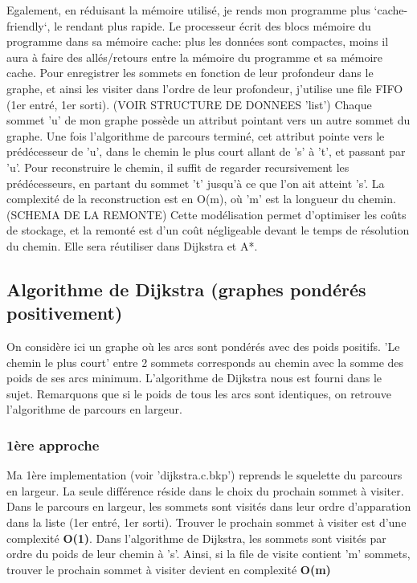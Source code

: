 \documentclass[10pt]{article}
\begin{document}
			Egalement, en réduisant la mémoire utilisé, je rends mon programme plus `cache-friendly`, le rendant plus rapide.
			Le processeur écrit des blocs mémoire du programme dans sa mémoire cache: plus les données sont compactes,
			moins il aura à faire des allés/retours entre la mémoire du programme et sa mémoire cache.\newline\newline
			Pour enregistrer les sommets en fonction de leur profondeur dans le graphe, et ainsi les visiter dans l'ordre de leur profondeur,
			j'utilise une file FIFO (1er entré, 1er sorti).\newline
			(VOIR STRUCTURE DE DONNEES 'list')\newline\newline
			Chaque sommet 'u' de mon graphe possède un attribut pointant vers un autre sommet du graphe.
			Une fois l'algorithme de parcours terminé, cet attribut pointe vers le prédécesseur de 'u',
			dans le chemin le plus court allant de 's' à 't', et passant par 'u'.
			Pour reconstruire le chemin, il suffit de regarder recursivement les prédécesseurs, en partant du sommet
			't' jusqu'à ce que l'on ait atteint 's'.
			La complexité de la reconstruction est en O(m), où 'm' est la longueur du chemin.\newline\newline
			(SCHEMA DE LA REMONTE)\newline\newline
			Cette modélisation permet d'optimiser les coûts de stockage, et la remonté est d'un coût négligeable devant le temps
			de résolution du chemin. Elle sera réutiliser dans Dijkstra et A*.
			
		\subsection{Algorithme de Dijkstra (graphes pondérés positivement)}
			On considère ici un graphe où les arcs sont pondérés avec des poids positifs.\newline
			'Le chemin le plus court' entre 2 sommets corresponds au chemin avec la somme des poids de ses arcs minimum.\newline
			L'algorithme de Dijkstra nous est fourni dans le sujet. Remarquons que si le poids de tous les arcs sont identiques,
			on retrouve l'algorithme de parcours en largeur.
			\subsubsection{1ère approche}
				Ma 1ère implementation (voir 'dijkstra.c.bkp') reprends le squelette du parcours en largeur.
				La seule différence réside dans le choix du prochain sommet à visiter.\newline
				Dans le parcours en largeur, les sommets sont visités dans leur ordre d'apparation
				dans la liste (1er entré, 1er sorti).
				Trouver le prochain sommet à visiter est d'une complexité \textbf{O(1)}.\newline\newline
				Dans l'algorithme de Dijkstra, les sommets sont visités par ordre du poids de leur chemin à 's'.
				Ainsi, si la file de visite contient 'm' sommets, trouver le prochain sommet
				à visiter devient en complexité \textbf{O(m)}
\end{document}
